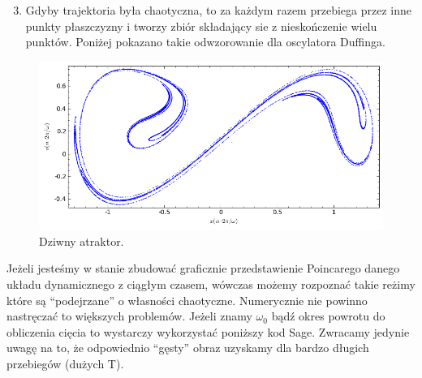 \documentclass[a4paper,12pt,polish]{sphinxmanual}
\begin{document}
\begin{enumerate}
\setcounter{enumi}{2}
\item {} 
Gdyby trajektoria była chaotyczna, to za każdym razem przebiega przez inne punkty płaszczyzny i tworzy zbiór składający sie z nieskończenie wielu punktów. Poniżej pokazano takie odwzorowanie dla oscylatora Duffinga.

\end{enumerate}
\begin{figure}[htbp]
\centering
\capstart

\includegraphics{chaotic_duffing.png}
\caption{Dziwny atraktor.}\end{figure}

Jeżeli jesteśmy w stanie zbudować graficznie przedstawienie Poincarego danego układu dynamicznego z ciągłym czasem, wówczas możemy rozpoznać takie reżimy które są ``podejrzane'' o własności chaotyczne.  Numerycznie nie powinno nastręczać to większych problemów. Jeżeli znamy $\omega_0$ bądź okres powrotu do obliczenia cięcia to wystarczy wykorzystać poniższy kod Sage. Zwracamy jedynie uwagę na to, że odpowiednio ``gęsty'' obraz uzyskamy dla bardzo długich przebiegów (dużych T).
\end{document}
